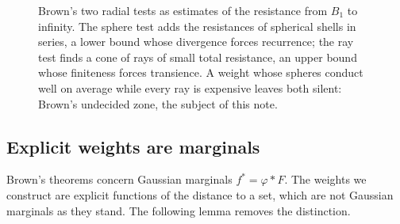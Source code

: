 \documentclass[11pt]{amsart}
\newcommand{\dd}{\,\mathrm{d}}
\newcommand{\fbar}{\bar f}
\theoremstyle{plain}
\theoremstyle{definition}
\theoremstyle{remark}
\begin{document}
\begin{figure}[t]
\centering
{}
\caption{Brown's two radial tests as estimates of the resistance from $B_1$ to
infinity. The sphere test adds the resistances of spherical shells in series, a
lower bound whose divergence forces recurrence; the ray test finds a cone of
rays of small total resistance, an upper bound whose finiteness forces
transience. A weight whose spheres conduct well on average while every ray is
expensive leaves both silent: Brown's undecided zone, the subject of this note.}
\label{fig:tests}
\end{figure}

\subsection{Explicit weights are marginals}
Brown's theorems concern Gaussian marginals $f^*=\varphi*F$. The weights we
construct are explicit functions of the distance to a set, which are not
Gaussian marginals as they stand. The following lemma removes the distinction.
\end{document}
